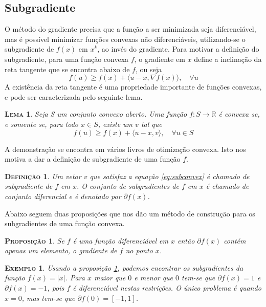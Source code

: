 \documentclass[
	12pt,				%
    oneside,			%
	a4paper,			%
	english,			%
	french,				%
	spanish,			%
	brazil,				%
	]{abntex2}
\newtheorem{lema}[theorem]{\scshape Lema}
\newtheorem{propo}[theorem]{\scshape Proposi\c{c}\~ao}
\newtheorem{definicao}{\scshape Defini\c{c}\~ao}[section]
\newtheorem{ex}{\scshape Exemplo}[section]
\begin{document}
        \subsection{Subgradiente}
            O método do gradiente precisa que a função a ser minimizada seja diferenciável, mas é possível minimizar funções convexas não diferenciáveis, utilizando-se o subgradiente de $f(x)$ em $x^k$, ao invés do gradiente.
            Para motivar a definição do subgradiente, para uma função convexa $f$, o gradiente em $x$ define a inclinação da reta tangente que se encontra abaixo de $f$, ou seja
            \begin{equation*}
                f(u) \geq f(x) + \langle u-x,\nabla f(x) \rangle, \quad \forall u
            \end{equation*}
            A existência da reta tangente é uma propriedade importante de funções convexas, e pode ser caracterizada pelo seguinte lema.
            \begin{lema}
                Seja S um conjunto convexo aberto. Uma função $f: S \to \mathbb{R}$ é convexa se, e somente se, para todo $x \in S$, existe um $v$ tal que
                \begin{equation}\label{eq:subconvex}
                    f(u) \geq f(x) + \langle u-x,v\rangle, \quad \forall u \in S
                \end{equation}
            \end{lema}
            A demonstração se encontra em vários livros de otimização convexa. Isto nos motiva a dar a definição de subgradiente de uma função $f$.
            \begin{definicao}
                Um vetor $v$ que satisfaz a equação \eqref{eq:subconvex} é chamado de \emph{subgradiente} de $f$ em $x$. O conjunto de subgradientes de $f$ em $x$ é chamado de \emph{conjunto diferencial} e é denotado por $\partial f(x)$.
            \end{definicao}

            Abaixo seguem duas proposições que nos dão um método de construção para os subgradientes de uma função convexa.
            \begin{propo}\label{prop:subdif}
                Se $f$ é uma função diferenciável em $x$ então $\partial f(x)$ contém apenas um elemento, o gradiente de $f$ no ponto $x$.
            \end{propo}

            \begin{ex}
                Usando a proposição \ref{prop:subdif}, podemos encontrar os subgradientes da função $f(x) = \vert x \vert$. Para $x$ maior que $0$ e menor que $0$ tem-se que $\partial f(x) = {1}$ e $\partial f(x) = {-1}$, pois $f$ é diferenciável nestas restrições. O único problema é quando $x=0$, mas tem-se que $\partial f(0) = [-1,1]$.
            \end{ex}
\end{document}
